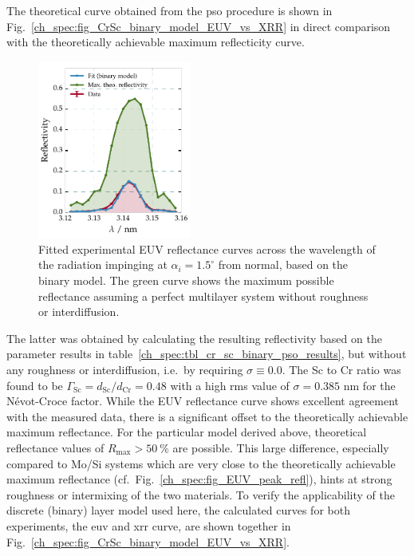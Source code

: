 The theoretical curve obtained from the \gls{pso} procedure is shown in Fig.~\ref{ch_spec:fig_CrSc_binary_model_EUV_vs_XRR} in direct comparison with the theoretically achievable maximum reflecticity curve.
\begin{figure}[htbp]
  \centering
  \includegraphics[width=0.45\textwidth]{img/CrSc_binary_fit_vs_max_refl}
  \caption{Fitted experimental EUV reflectance curves across the wavelength 
of the radiation impinging at $\alpha_i=1.5^\circ$ from normal, based on the binary 
model. The green curve shows the maximum possible reflectance assuming a perfect multilayer system without roughness or interdiffusion.}
  \label{ch_spec:fig_CrSc_binary_fit_vs_max_refl}
\end{figure}
The latter was obtained by calculating the resulting reflectivity based on the parameter results in table~\ref{ch_spec:tbl_cr_sc_binary_pso_results}, but without any roughness or interdiffusion, i.e.~by requiring $\sigma \equiv 0.0$. The Sc 
to Cr ratio was found to be $\Gamma_\text{Sc}= d_\text{Sc}/d_\text{Cr} = 0.48$ with a high \gls{rms} value of $\sigma=0.385$ nm for the N\'{e}vot-Croce factor. While the EUV reflectance curve shows excellent agreement with the measured data, there is a significant offset to the theoretically achievable maximum reflectance. For the particular model derived above, theoretical reflectance values of $R_\text{max} > \SI{50}{\percent}$ are possible. This large difference, especially compared to Mo/Si systems which are very close to the theoretically achievable maximum reflectance (cf.~Fig.~\ref{ch_spec:fig_EUV_peak_refl}), hints at strong roughness or intermixing of the two materials. To verify the applicability of the discrete (binary) layer model used here, the calculated curves for both experiments, the \gls{euv} and \gls{xrr} curve, are shown together in Fig.~\ref{ch_spec:fig_CrSc_binary_model_EUV_vs_XRR}.
